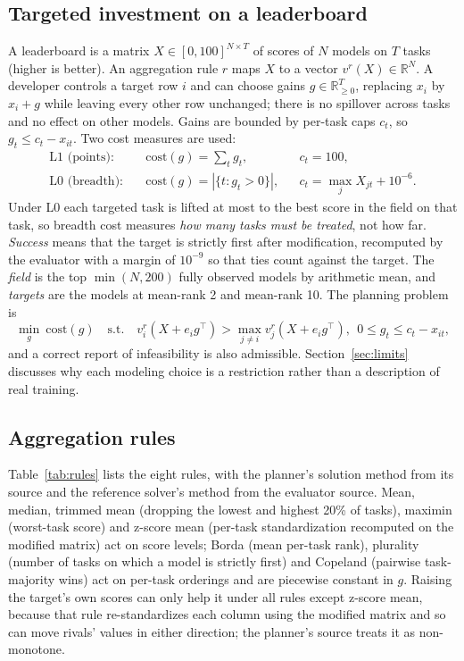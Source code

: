\documentclass{article}
\begin{document}
\subsection{Targeted investment on a leaderboard}
A leaderboard is a matrix $X\in[0,100]^{N\times T}$ of scores of $N$ models on $T$ tasks (higher is better). An aggregation rule $r$ maps $X$ to a vector $v^r(X)\in\mathbb{R}^N$. A developer controls a target row $i$ and can choose gains $g\in\mathbb{R}^T_{\ge 0}$, replacing $x_i$ by $x_i+g$ while leaving every other row unchanged; there is no spillover across tasks and no effect on other models. Gains are bounded by per-task caps $c_t$, so $g_t\le c_t-x_{it}$. Two cost measures are used:
\begin{align}
\text{L1 (points):}\quad & \mathrm{cost}(g)=\textstyle\sum_t g_t, && c_t=100,\\
\text{L0 (breadth):}\quad & \mathrm{cost}(g)=|\{t: g_t>0\}|, && c_t=\max_j X_{jt}+10^{-6}.
\end{align}
Under L0 each targeted task is lifted at most to the best score in the field on that task, so breadth cost measures \emph{how many tasks must be treated}, not how far. \emph{Success} means that the target is strictly first after modification, recomputed by the evaluator with a margin of $10^{-9}$ so that ties count against the target. The \emph{field} is the top $\min(N,200)$ fully observed models by arithmetic mean, and \emph{targets} are the models at mean-rank 2 and mean-rank 10. The planning problem is
\begin{equation}
\min_{g}\ \mathrm{cost}(g)\quad\text{s.t.}\quad v^r_i(X+e_i g^\top)>\max_{j\neq i}v^r_j(X+e_i g^\top),\ \ 0\le g_t\le c_t-x_{it},
\end{equation}
and a correct report of infeasibility is also admissible. Section~\ref{sec:limits} discusses why each modeling choice is a restriction rather than a description of real training.

\subsection{Aggregation rules}
Table~\ref{tab:rules} lists the eight rules, with the planner's solution method from its source and the reference solver's method from the evaluator source. Mean, median, trimmed mean (dropping the lowest and highest 20\% of tasks), maximin (worst-task score) and z-score mean (per-task standardization recomputed on the modified matrix) act on score levels; Borda (mean per-task rank), plurality (number of tasks on which a model is strictly first) and Copeland (pairwise task-majority wins) act on per-task orderings and are piecewise constant in $g$. Raising the target's own scores can only help it under all rules except z-score mean, because that rule re-standardizes each column using the modified matrix and so can move rivals' values in either direction; the planner's source treats it as non-monotone.
\end{document}
